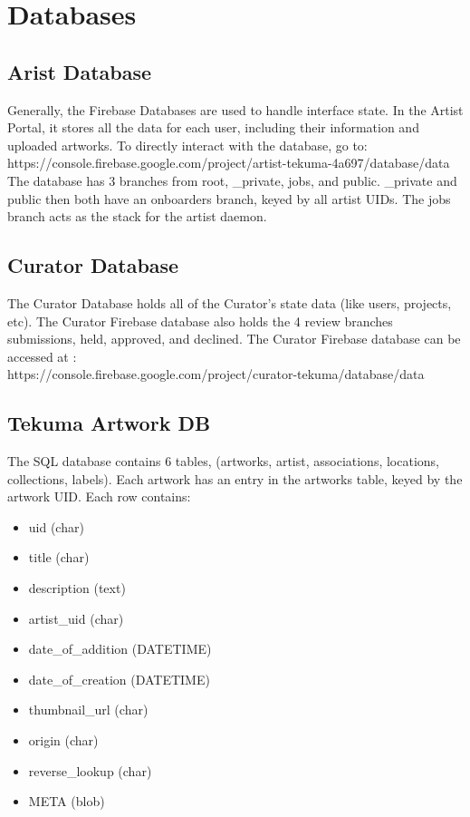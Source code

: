\documentclass[fontsize=12pt]{scrartcl} %
\numberwithin{equation}{section} %
\numberwithin{figure}{section} %
\numberwithin{table}{section} %
\begin{document}
\section{Databases}
\subsection{Arist Database}
Generally, the Firebase Databases are used to handle interface state. In the Artist Portal, it stores all the data for each user, including their information and uploaded artworks. To directly interact with the database, go to:
https://console.firebase.google.com/project/artist-tekuma-4a697/database/data \\
The database has 3 branches from root, \_private, jobs, and public. \_private and public then both have an onboarders branch, keyed by all artist UIDs. The jobs branch acts as the stack for the artist daemon.

\subsection{Curator Database}
The Curator Database holds all of the Curator's state data (like users, projects, etc). The Curator Firebase database also holds the 4 review branches submissions, held, approved, and declined. The Curator Firebase database can be accessed at : \\
https://console.firebase.google.com/project/curator-tekuma/database/data


\subsection{Tekuma Artwork DB}
The SQL database contains 6 tables, (artworks, artist, associations, locations, collections, labels). Each artwork has an entry in the artworks table, keyed by the artwork UID. Each row contains:
\begin{itemize}
    \item uid (char)
    \item title (char)
    \item description (text)
    \item artist\_uid (char)
    \item date\_of\_addition (DATETIME)
    \item date\_of\_creation (DATETIME)
    \item thumbnail\_url (char)
    \item origin (char)
    \item reverse\_lookup (char)
    \item META (blob)
\end{itemize}
\end{document}

